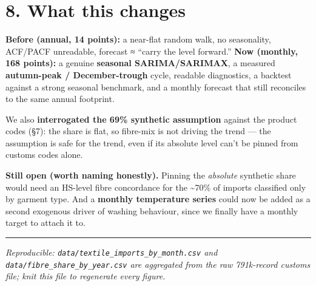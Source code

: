 \documentclass[
]{article}
\begin{document}
\section{8. What this changes}\label{what-this-changes}

\textbf{Before (annual, 14 points):} a near-flat random walk, no
seasonality, ACF/PACF unreadable, forecast ≈ ``carry the level
forward.'' \textbf{Now (monthly, 168 points):} a genuine
\textbf{seasonal SARIMA/SARIMAX}, a measured \textbf{autumn-peak /
December-trough} cycle, readable diagnostics, a backtest against a
strong seasonal benchmark, and a monthly forecast that still reconciles
to the same annual footprint.

We also \textbf{interrogated the 69\% synthetic assumption} against the
product codes (§7): the share is flat, so fibre-mix is not driving the
trend --- the assumption is safe for the trend, even if its absolute
level can't be pinned from customs codes alone.

\textbf{Still open (worth naming honestly).} Pinning the \emph{absolute}
synthetic share would need an HS-level fibre concordance for the
\textasciitilde70\% of imports classified only by garment type. And a
\textbf{monthly temperature series} could now be added as a second
exogenous driver of washing behaviour, since we finally have a monthly
target to attach it to.

\begin{center}\rule{0.5\linewidth}{0.5pt}\end{center}

\emph{Reproducible: \texttt{data/textile\_imports\_by\_month.csv} and
\texttt{data/fibre\_share\_by\_year.csv} are aggregated from the raw
791k-record customs file; knit this file to regenerate every figure.}
\end{document}
